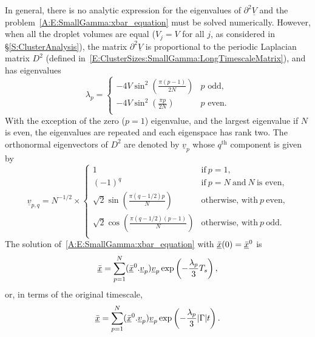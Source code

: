 \begin{subappendices}
In general, there is no analytic expression for the eigenvalues of $\partial^2\underline{V} $ and the problem~\eqref{A:E:SmallGamma:xbar_equation} must be solved numerically. However, when all the droplet volumes are equal ($V_j = V$ for all $j$, as considered in \S\ref{S:ClusterAnalysis}), the matrix $\partial^2\underline{V}$ is proportional to the periodic Laplacian matrix $D^2$ (defined in~\eqref{E:ClusterSizes:SmallGamma:LongTimescaleMatrix}), and has eigenvalues
\begin{equation}\label{A:E:SmallGamma:Eigenvalues}
\lambda_p =\left\{
 \begin{array}{ll}
- 4V\sin^2\left(\frac{\pi(p-1)}{2N}\right) & p \text{~odd,}\\
- 4V\sin^2\left(\frac{\pi p}{2N} \right) & p\text{~even.}\\
 \end{array}\right.
\end{equation}
With the exception of the zero ($p = 1$) eigenvalue, and the largest eigenvalue if $N$ is even, the eigenvalues are repeated and each eigenspace has rank two. The orthonormal eigenvectors of $D^2$ are denoted by $\underline{v}_p$ whose $q^{\text{th}}$ component is given by
\begin{equation}\label{A:E:SmallGamma:Eigenvectors}
\underline{v}_{p,q} =N^{-1/2} \times\left\{
 \begin{array}{ll}
1&  \text{if}~p = 1,\\
 (-1)^q   & \text{if}~p = N ~ \text{and} ~ N ~\text{is even,}\\
\sqrt{2}\sin \left(\frac{\pi(q-1/2)p}{N}\right) & \text{otherwise, with}~p ~ \text{even,} \\
  \sqrt{2}\cos \left(\frac{\pi(q-1/2)(p-1)}{N}\right) & \text{otherwise, with}~p ~ \text{odd.} \\
  \end{array}\right.
\end{equation}
The solution of~\eqref{A:E:SmallGamma:xbar_equation}  with $\underline{\bar{x}}(0) =\underline{\bar{x}}^0$ is
\begin{equation}\label{A:E:SmallGamma:xbar_solutionLongTime}
\underline{\bar{x}} = \sum_{p=1}^{N} (\underline{\bar{x}}^0.\underline{v}_p)\underline{v}_p\exp\left(-\frac{\lambda_p}{3} T_s\right),
\end{equation}
or, in terms of the original timescale,
\begin{equation}\label{A:E:SmallGamma:xbar_solution}
\underline{\xbar} = \sum_{p=1}^{N} (\underline{\xbar}^0.\underline{v}_p)\underline{v}_p\exp\left(-\frac{\lambda_p}{3}  \smallpar t\right).

\end{equation}
\end{subappendices}
